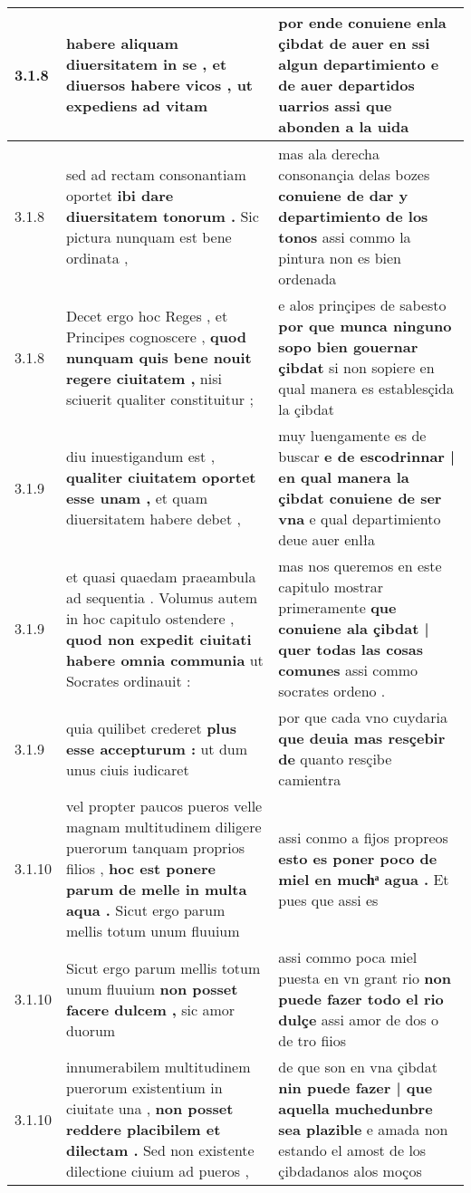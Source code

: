 \begin{tabular}{|p{1cm}|p{6.5cm}|p{6.5cm}|}
3.1.8 & habere aliquam diuersitatem in se , \textbf{ et diuersos habere vicos , } ut expediens ad vitam & por ende conuiene enla çibdat de auer en ssi algun departimiento \textbf{ e de auer departidos uarrios } assi que abonden a la uida \\\hline
3.1.8 & sed ad rectam consonantiam oportet \textbf{ ibi dare diuersitatem tonorum . } Sic pictura nunquam est bene ordinata , & mas ala derecha consonançia delas bozes \textbf{ conuiene de dar y departimiento de los tonos } assi commo la pintura non es bien ordenada \\\hline
3.1.8 & Decet ergo hoc Reges , et Principes cognoscere , \textbf{ quod nunquam quis bene nouit regere ciuitatem , } nisi sciuerit qualiter constituitur ; & e alos prinçipes de sabesto \textbf{ por que munca ninguno sopo bien gouernar çibdat } si non sopiere en qual manera es establesçida la çibdat \\\hline
3.1.9 & diu inuestigandum est , \textbf{ qualiter ciuitatem oportet esse unam , } et quam diuersitatem habere debet , & muy luengamente es de buscar \textbf{ e de escodrinnar | en qual manera la çibdat conuiene de ser vna } e qual departimiento deue auer enlła \\\hline
3.1.9 & et quasi quaedam praeambula ad sequentia . Volumus autem in hoc capitulo ostendere , \textbf{ quod non expedit ciuitati habere omnia communia } ut Socrates ordinauit : & mas nos queremos en este capitulo mostrar primeramente \textbf{ que conuiene ala çibdat | quer todas las cosas comunes } assi commo socrates ordeno . \\\hline
3.1.9 & quia quilibet crederet \textbf{ plus esse accepturum : } ut dum unus ciuis iudicaret & por que cada vno cuydaria \textbf{ que deuia mas resçebir de } quanto resçibe camientra \\\hline
3.1.10 & vel propter paucos pueros velle magnam multitudinem diligere puerorum tanquam proprios filios , \textbf{ hoc est ponere parum de melle in multa aqua . } Sicut ergo parum mellis totum unum fluuium & assi conmo a fijos propreos \textbf{ esto es poner poco de miel en muchͣ agua . } Et pues que assi es \\\hline
3.1.10 & Sicut ergo parum mellis totum unum fluuium \textbf{ non posset facere dulcem , } sic amor duorum & assi commo poca miel puesta en vn grant rio \textbf{ non puede fazer todo el rio dulçe } assi amor de dos o de tro fiios \\\hline
3.1.10 & innumerabilem multitudinem puerorum existentium in ciuitate una , \textbf{ non posset reddere placibilem et dilectam . } Sed non existente dilectione ciuium ad pueros , & de que son en vna çibdat \textbf{ nin puede fazer | que aquella muchedunbre sea plazible } e amada non estando el amost de los çibdadanos alos moços \\\hline

\end{tabular}
